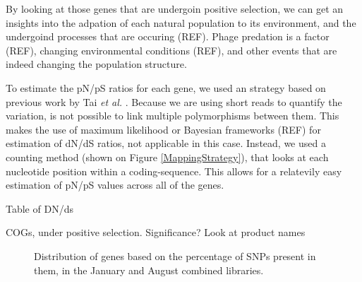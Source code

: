 By looking at those genes that are undergoin positive selection, we can get an insights into the adpation of each natural population to its environment, and the undergoind processes that are occuring (REF). Phage predation is a factor (REF), changing environmental conditions (REF), and other events that are indeed changing the population structure.

To estimate the pN/pS ratios for each gene, we used an strategy based on previous work by Tai \textit{et al.} \cite{Tai:2011jo}. Because we are using short reads to quantify the variation, is not possible to link multiple polymorphisms between them. This makes the use of maximum likelihood or Bayesian frameworks (REF) for estimation of dN/dS ratios, not applicable in this case. Instead, we used a counting method (shown on Figure \ref{MappingStrategy}), that looks at each nucleotide position within a coding-sequence. This allows for a relatevily easy estimation of pN/pS values across all of the genes.



Table of DN/ds

COGs, under positive selection. Significance?
Look at product names
 


\begin{figure}[h]
\centering
{}
    \hfill
{}
    \caption{Distribution of genes based on the percentage of SNPs present in them, in the January and August combined libraries.}
    \label{SNPs_Boxplot}
\end{figure}


